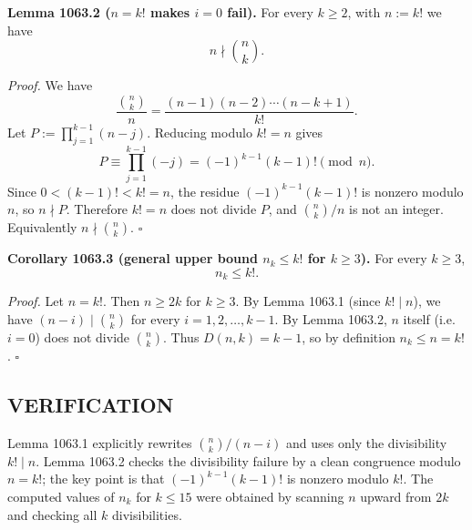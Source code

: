 \medskip
\textbf{Lemma 1063.2 ($n=k!$ makes $i=0$ fail).}
For every $k\ge 2$, with $n:=k!$ we have
\[
 n\nmid \binom{n}{k}.
\]

\emph{Proof.}
We have
\[
\frac{\binom{n}{k}}{n} = \frac{(n-1)(n-2)\cdots (n-k+1)}{k!}.
\]
Let $P:=\prod_{j=1}^{k-1} (n-j)$. Reducing modulo $k!=n$ gives
\[
P \equiv \prod_{j=1}^{k-1} (-j) = (-1)^{k-1}(k-1)! \pmod{n}.
\]
Since $0<(k-1)!<k!=n$, the residue $(-1)^{k-1}(k-1)!$ is nonzero modulo $n$, so $n\nmid P$.
Therefore $k!=n$ does not divide $P$, and $\binom{n}{k}/n$ is not an integer. Equivalently $n\nmid \binom{n}{k}$. \hfill$\square$

\medskip
\textbf{Corollary 1063.3 (general upper bound $n_k\le k!$ for $k\ge 3$).}
For every $k\ge 3$,
\[
 n_k \le k!.
\]

\emph{Proof.}
Let $n=k!$. Then $n\ge 2k$ for $k\ge 3$.
By Lemma 1063.1 (since $k!\mid n$), we have $(n-i)\mid \binom{n}{k}$ for every $i=1,2,\dots,k-1$.
By Lemma 1063.2, $n$ itself (i.e. $i=0$) does not divide $\binom{n}{k}$.
Thus $D(n,k)=k-1$, so by definition $n_k\le n=k!$. \hfill$\square$

\subsection*{VERIFICATION}
Lemma 1063.1 explicitly rewrites $\binom{n}{k}/(n-i)$ and uses only the divisibility $k!\mid n$.
Lemma 1063.2 checks the divisibility failure by a clean congruence modulo $n=k!$; the key point is that $(-1)^{k-1}(k-1)!$ is nonzero modulo $k!$.
The computed values of $n_k$ for $k\le 15$ were obtained by scanning $n$ upward from $2k$ and checking all $k$ divisibilities.

